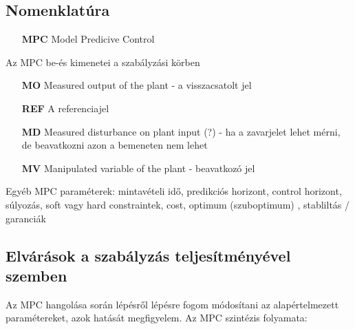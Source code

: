 \subsection*{Nomenklatúra}

\begin{itemize}[noitemsep,topsep=-8pt,parsep=0pt,partopsep=0pt,leftmargin=42pt]
	\item[\textbf{MPC}] Model Predicive Control
\end{itemize}

\vspace{12pt}


\begin{table*}[h]
	\caption{Az MPC be-és kimenetei a szabályzási körben}
	\label{nomencl_mpcsignals}
	\begin{itemize}[noitemsep,topsep=0pt,parsep=2pt,partopsep=4pt,leftmargin=42pt]
		\item[\textbf{MO}] Measured output of the plant - a visszacsatolt jel
		\item[\textbf{REF}] A referenciajel %
		\item[\textbf{MD}] Measured disturbance on plant input (?) - ha a zavarjelet lehet mérni, de beavatkozni azon a bemeneten nem lehet
		\item[\textbf{MV}] Manipulated variable of the plant - beavatkozó jel 
	\end{itemize}
\end{table*}
Egyéb MPC paraméterek: mintavételi idő, predikciós horizont, control horizont, súlyozás, soft vagy hard constraintek, cost, optimum (szuboptimum) , stabliltás / garanciák






\subsection{Elvárások a szabályzás teljesítményével szemben}

Az MPC hangolása során %
lépésről lépésre fogom módosítani az alapértelmezett paramétereket, azok hatását megfigyelem.
Az MPC szintézis folyamata:%


